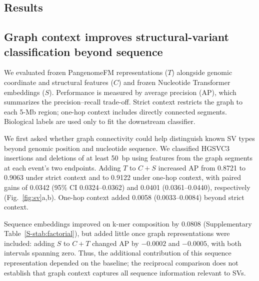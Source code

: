 \documentclass[11pt]{article}
\newcommand{\CI}{95\% CI\xspace}
\begin{document}
\begin{bibunit}[unsrtnat]
\FloatBarrier
\section{Results}
\label{sec:results}

\subsection{Graph context improves structural-variant classification beyond sequence}
\label{sec:sv-result}

We evaluated frozen PangenomeFM representations ($T$) alongside genomic coordinate and structural features ($C$) and frozen Nucleotide Transformer embeddings ($S$). Performance is measured by average precision (AP), which summarizes the precision--recall trade-off. Strict context restricts the graph to each 5-Mb region; one-hop context includes directly connected segments. Biological labels are used only to fit the downstream classifier.

We first asked whether graph connectivity could help distinguish known SV types beyond genomic position and nucleotide sequence. We classified HGSVC3 insertions and deletions of at least 50~bp\cite{hgsvc32025} using features from the graph segments at each event's two endpoints. Adding $T$ to $C+S$ increased AP from 0.8721 to 0.9063 under strict context and to 0.9122 under one-hop context, with paired gains of 0.0342 (\CI 0.0324--0.0362) and 0.0401 (0.0361--0.0440), respectively (Fig.~\ref{fig:sv}a,b). One-hop context added 0.0058 (0.0033--0.0084) beyond strict context.

Sequence embeddings improved on k-mer composition by 0.0808 (Supplementary Table~\ref{S-stab:factorial}), but added little once graph representations were included: adding $S$ to $C+T$ changed AP by $-0.0002$ and $-0.0005$, with both intervals spanning zero. Thus, the additional contribution of this sequence representation depended on the baseline; the reciprocal comparison does not establish that graph context captures all sequence information relevant to SVs.


\end{bibunit}
\end{document}
